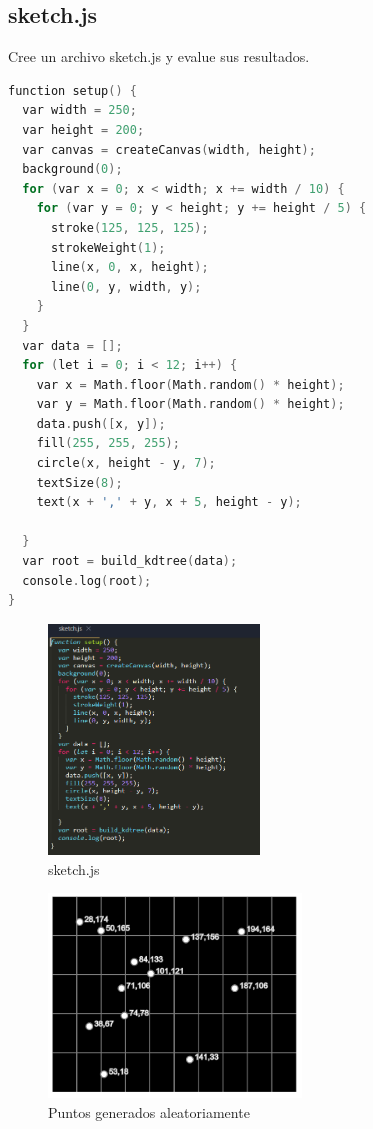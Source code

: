 \subsection{sketch.js}
Cree un archivo sketch.js y evalue sus resultados.
\begin{lstlisting}[language=C++,
                   directivestyle={\color{black}}
                   emph={int,char,double,float,unsigned},
                   emphstyle={\color{blue}}
                  ]
function setup() {
  var width = 250;
  var height = 200;
  var canvas = createCanvas(width, height);
  background(0);
  for (var x = 0; x < width; x += width / 10) {
    for (var y = 0; y < height; y += height / 5) {
      stroke(125, 125, 125);
      strokeWeight(1);
      line(x, 0, x, height);
      line(0, y, width, y);
    }
  }
  var data = [];
  for (let i = 0; i < 12; i++) {
    var x = Math.floor(Math.random() * height);
    var y = Math.floor(Math.random() * height);
    data.push([x, y]);
    fill(255, 255, 255);
    circle(x, height - y, 7);
    textSize(8);
    text(x + ',' + y, x + 5, height - y);
    
  }
  var root = build_kdtree(data);
  console.log(root);
}
\end{lstlisting}
\begin{figure}[H]
  \centering
  \includegraphics[width=0.5\textwidth]{images/tres.PNG}
  \caption{sketch.js}
  \label{fig:act-2}
\end{figure}

\begin{figure}[H]
  \centering
  \includegraphics[width=0.6\textwidth]{images/dos.PNG}
  \caption{Puntos generados aleatoriamente}
  \label{fig:act-3}
\end{figure}

